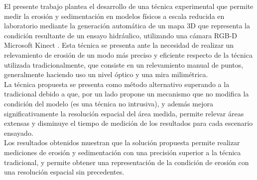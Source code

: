 \begin{resumen}
El presente trabajo plantea el desarrollo de una técnica experimental que permite medir la erosión y sedimentación en modelos físicos a escala reducida en laboratorio mediante la generación automática de un mapa 3D que representa la condición resultante de un ensayo hidráulico, utilizando una cámara RGB-D Microsoft Kinect \cite{microsoft-kinect}. Esta técnica se presenta ante la necesidad de realizar un relevamiento de erosión de un modo más preciso y eficiente respecto de la técnica utilizada tradicionalmente, que consiste en un relevamiento manual de puntos, generalmente haciendo uso un nivel óptico y una mira milimétrica. \\
La técnica propuesta se presenta como método alternativo superando a la tradicional debido a que, por un lado propone un mecanismo que no modifica la condición del modelo (es una técnica no intrusiva), y además mejora significativamente la resolución espacial del área medida, permite relevar áreas extensas y disminuye el tiempo de medición de los resultados para cada escenario ensayado. \\
Los resultados obtenidos muestran que la solución propuesta permite realizar mediciones de erosión y sedimentación con una precisión superior a la técnica tradicional, y permite obtener una representación de la condición de erosión con una resolución espacial sin precedentes. 
\end{resumen}


